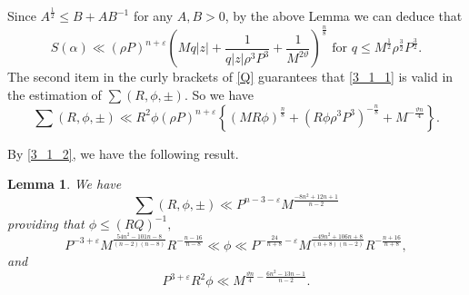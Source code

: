 \documentclass[12pt]{amsart}
\newtheorem{lemma}[theorem]{Lemma}
\theoremstyle{definition}
\numberwithin{equation}{section}
\begin{document}
Since $A^{\frac{1}{2}} \leq B +AB^{-1}$ for any $A, B >0$, by the above Lemma we can deduce that
\begin{equation}
    \label{3_1_1}
    S(\alpha) \ll (\rho P)^{n+\varepsilon}\left(Mq|z|+\frac{1}{q|z|\rho^3 P^3}+\frac{1}{M^{2\vartheta}}\right)^{\frac{n}{8}}\text{ for }q \leq M^{\frac{1}{2}}\rho^{\frac{3}{2}}P^{\frac{3}{2}}.
\end{equation}
The second item in the curly brackets of \eqref{Q}  guarantees that \eqref{3_1_1} is valid in the estimation of $\sum(R,\phi,\pm)$. So we have
\begin{equation}
    \label{3_1_2}
    \sum(R,\phi,\pm) \ll R^2 \phi (\rho P)^{n+\varepsilon}\left\{ (MR\phi)^{\frac{n}{8}}+(R\phi\rho^3 P^3)^{-\frac{n}{8}}+M^{-\frac{\vartheta n}{4}}\right\}.
\end{equation}

By \eqref{3_1_2}, we have the following result.

\begin{lemma}
    \label{lemma3_2}
We have
\begin{equation*}
    \sum(R,\phi,\pm) \ll P^{n-3-\varepsilon}M^{\frac{-8n^2+12n+1}{n-2}}
\end{equation*}
providing that $\phi \leq (RQ)^{-1},$ 
\begin{equation*}
    P^{-3+\varepsilon}M^{\frac{54n^2-101n-8}{(n-2)(n-8)}}R^{-\frac{n-16}{n-8}} \ll \phi \ll P^{-\frac{24}{n+8}-\varepsilon}M^{\frac{-49n^2+106n+8}{(n+8)(n-2)}}R^{-\frac{n+16}{n+8}},
\end{equation*}
and
\begin{equation}
 \label{minor_requir_vartheta}
    P^{3+\varepsilon}R^2\phi \ll M^{\frac{\vartheta n}{4}-\frac{6n^2-13n-1}{n-2}}.
\end{equation}
\end{lemma}
\end{document}
